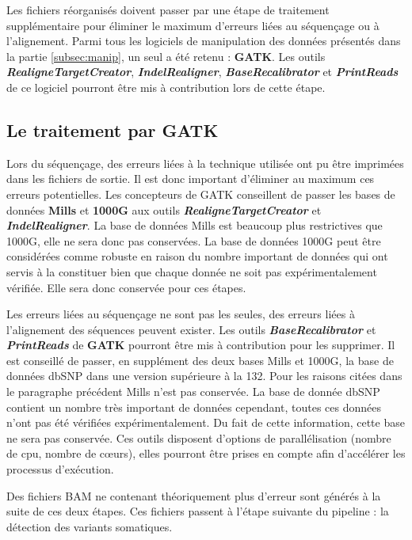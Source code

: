 Les fichiers réorganisés doivent passer par une étape de traitement supplémentaire pour éliminer le maximum d'erreurs liées au séquençage ou à l'alignement. Parmi tous les logiciels de manipulation des données présentés dans la partie \ref{subsec:manip}, un seul a été retenu : \textbf{GATK}. Les outils \textit{\textbf{RealigneTargetCreator}}, \textit{\textbf{IndelRealigner}}, \textit{\textbf{BaseRecalibrator}} et \textit{\textbf{PrintReads}} de ce logiciel pourront être mis à contribution lors de cette étape.

\newpage
\subsection{Le traitement par GATK}\label{sec: GATK}

Lors du séquençage, des erreurs liées à la technique utilisée ont pu être imprimées dans les fichiers de sortie. Il est donc important d'éliminer au maximum ces erreurs potentielles. Les concepteurs de GATK conseillent de passer les bases de données \textbf{Mills} et \textbf{1000G} aux outils \textit{\textbf{RealigneTargetCreator}} et \textit{\textbf{IndelRealigner}}. La base de données Mills est beaucoup plus restrictives que 1000G, elle ne sera donc pas conservées. La base de données 1000G peut être considérées comme robuste en raison du nombre important de données qui ont servis à la constituer bien que chaque donnée ne soit pas expérimentalement vérifiée. Elle sera donc conservée pour ces étapes.

Les erreurs liées au séquençage ne sont pas les seules, des erreurs liées à l'alignement des séquences peuvent exister. Les outils \textit{\textbf{BaseRecalibrator}} et \textit{\textbf{PrintReads}} de \textbf{GATK} pourront être mis à contribution pour les supprimer. Il est conseillé de passer, en supplément des deux bases Mills et 1000G, la base de données dbSNP dans une version supérieure à la 132. Pour les raisons citées dans le paragraphe précédent Mills n'est pas conservée. La base de donnée dbSNP contient un nombre très important de données cependant, toutes ces données n'ont pas été vérifiées expérimentalement. Du fait de cette information, cette base ne sera pas conservée. Ces outils disposent d'options de parallélisation (nombre de cpu, nombre de cœurs), elles pourront être prises en compte afin d'accélérer les processus d'exécution.

Des fichiers BAM ne contenant théoriquement plus d'erreur sont générés à la suite de ces deux étapes. Ces fichiers passent à l'étape suivante du pipeline : la détection des variants somatiques.

